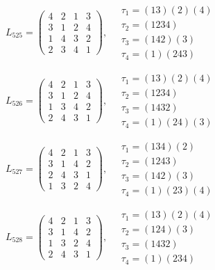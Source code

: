 $L_{525} = \begin{pmatrix} 4 & 2 & 1 & 3 \\ 3 & 1 & 2 & 4 \\ 1 & 4 & 3 & 2 \\ 2 & 3 & 4 & 1 \end{pmatrix}, \quad \begin{matrix} \tau_{1} = (1 3)(2)(4) \\ \tau_{2} = (1 2 3 4) \\ \tau_{3} = (1 4 2)(3) \\ \tau_{4} = (1)(2 4 3) \end{matrix}$

$L_{526} = \begin{pmatrix} 4 & 2 & 1 & 3 \\ 3 & 1 & 2 & 4 \\ 1 & 3 & 4 & 2 \\ 2 & 4 & 3 & 1 \end{pmatrix}, \quad \begin{matrix} \tau_{1} = (1 3)(2)(4) \\ \tau_{2} = (1 2 3 4) \\ \tau_{3} = (1 4 3 2) \\ \tau_{4} = (1)(2 4)(3) \end{matrix}$

$L_{527} = \begin{pmatrix} 4 & 2 & 1 & 3 \\ 3 & 1 & 4 & 2 \\ 2 & 4 & 3 & 1 \\ 1 & 3 & 2 & 4 \end{pmatrix}, \quad \begin{matrix} \tau_{1} = (1 3 4)(2) \\ \tau_{2} = (1 2 4 3) \\ \tau_{3} = (1 4 2)(3) \\ \tau_{4} = (1)(2 3)(4) \end{matrix}$

$L_{528} = \begin{pmatrix} 4 & 2 & 1 & 3 \\ 3 & 1 & 4 & 2 \\ 1 & 3 & 2 & 4 \\ 2 & 4 & 3 & 1 \end{pmatrix}, \quad \begin{matrix} \tau_{1} = (1 3)(2)(4) \\ \tau_{2} = (1 2 4)(3) \\ \tau_{3} = (1 4 3 2) \\ \tau_{4} = (1)(2 3 4) \end{matrix}$

